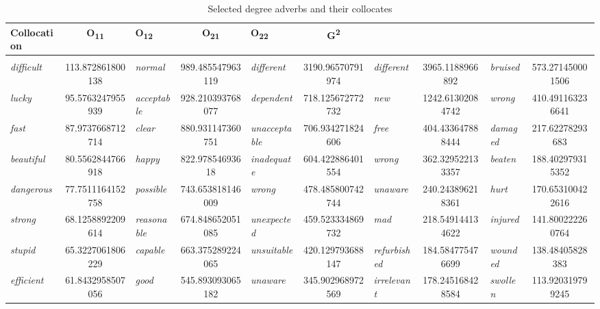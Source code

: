 \begin{sidewaystable}[!htbp]
\caption{Selected degree adverbs and their collocates}
\label{tab:degreeadverbs}
\begin{tabular}[c]{lS|lS|lS|lS|lS}
\lsptoprule
Collocation & O\textsubscript{11} & O\textsubscript{12} & O\textsubscript{21} & O\textsubscript{22}  & G\textsuperscript{2} \\
\midrule
{} &  &  &  &  \\
\midrule
\textit{difficult} & \num{113.872861800138} &  \textit{normal} & \num{989.485547963119} &   \textit{different} & \num{3190.96570791974} &  \textit{different} & \num{3965.1188966892} &    \textit{bruised} & \num{573.271450001506} \\
\textit{lucky} & \num{95.5763247955939} &  \textit{acceptable} & \num{928.210393768077} &   \textit{dependent} & \num{718.125672772732} &  \textit{new} & \num{1242.61302084742} &    \textit{wrong} & \num{410.491163236641} \\
\textit{fast} & \num{87.9737668712714} &  \textit{clear} & \num{880.931147360751} &   \textit{unacceptable} & \num{706.934271824606} &  \textit{free} & \num{404.433647888444} &    \textit{damaged} & \num{217.62278293683} \\
\textit{beautiful} & \num{80.5562844766918} &  \textit{happy} & \num{822.97854693618} &   \textit{inadequate} & \num{604.422886401554} &  \textit{wrong} & \num{362.329522133357} &    \textit{beaten} & \num{188.402979315352} \\
\textit{dangerous} & \num{77.7511164152758} &  \textit{possible} & \num{743.653818146009} &   \textit{wrong} & \num{478.485800742744} &  \textit{unaware} & \num{240.243896218361} &    \textit{hurt} & \num{170.653100422616} \\
\textit{strong} & \num{68.1258892209614} &  \textit{reasonable} & \num{674.848652051085} &   \textit{unexpected} & \num{459.523334869732} &  \textit{mad} & \num{218.549144134622} &    \textit{injured} & \num{141.800222260764} \\
\textit{stupid} & \num{65.3227061806229} &  \textit{capable} & \num{663.375289224065} &   \textit{unsuitable} & \num{420.129793688147} &  \textit{refurbished} & \num{184.584775476699} &    \textit{wounded} & \num{138.48405828383} \\
\textit{efficient} & \num{61.8432958507056} &  \textit{good} & \num{545.893093065182} &   \textit{unaware} & \num{345.902968972569} &  \textit{irrelevant} & \num{178.245168428584} &    \textit{swollen} & \num{113.920319799245} \\

\end{tabular}
\end{sidewaystable}
